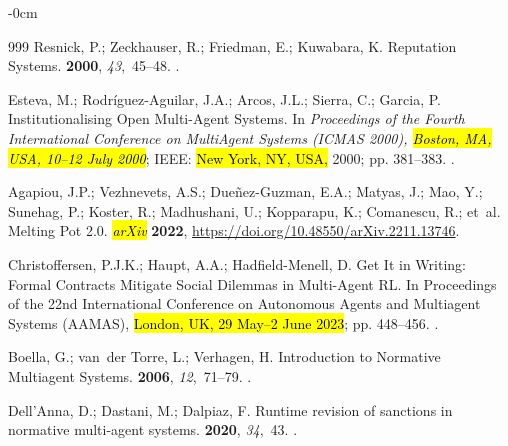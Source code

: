 \documentclass[mca,article,accept,pdftex,oneauthor]{Definitions/mdpi}
\begin{document}
\begin{adjustwidth}{-\extralength}{0cm}
\begin{thebibliography}{999}
Resnick, P.; Zeckhauser, R.; Friedman, E.; Kuwabara, K.
\newblock Reputation Systems.
 {\bf 2000}, {\em 43},~45--48.
.

Esteva, M.; Rodríguez-Aguilar, J.A.; Arcos, J.L.; Sierra, C.; Garcia, P.
\newblock Institutionalising Open Multi-Agent Systems.
\newblock In \emph{Proceedings of the Fourth International Conference on MultiAgent
  Systems (ICMAS 2000), \hl{Boston, MA, USA, 10--12 July 2000}}; IEEE: \hl{New York, NY, USA,}  2000; pp. 381--383.
.

Agapiou, J.P.; Vezhnevets, A.S.; Due{\~n}ez-Guzman, E.A.; Matyas, J.; Mao, Y.;
  Sunehag, P.; Koster, R.; Madhushani, U.; Kopparapu, K.; Comanescu, R.;
  et~al.
\newblock Melting Pot 2.0.
\newblock \emph{\hl{arXiv}}   %
\textbf{2022}, {\url{https://doi.org/10.48550/arXiv.2211.13746}}.

Christoffersen, P.J.K.; Haupt, A.A.; Hadfield-Menell, D.
\newblock Get It in Writing: Formal Contracts Mitigate Social Dilemmas in
  Multi-Agent RL.
\newblock In Proceedings of the 22nd International Conference on Autonomous
  Agents and Multiagent Systems (AAMAS),  \hl{London, UK, 29 May--2 June 2023}; pp. 448--456.
.

Boella, G.; van~der Torre, L.; Verhagen, H.
\newblock Introduction to Normative Multiagent Systems.
 {\bf 2006},
  {\em 12},~71--79.
.

Dell'Anna, D.; Dastani, M.; Dalpiaz, F.
\newblock Runtime revision of sanctions in normative multi-agent systems.
 {\bf 2020}, {\em
  34},~43.
.


\end{thebibliography}
\end{adjustwidth}
\end{document}
